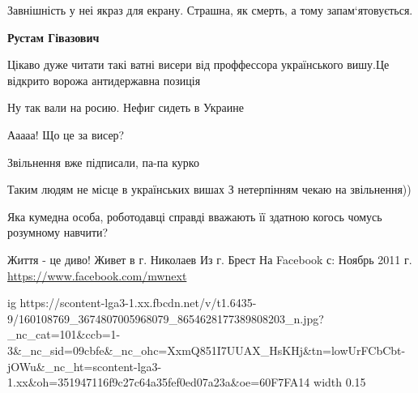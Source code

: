 Завнішність у неі якраз для екрану. Страшна, як смерть, а тому
запам‘ятовується.



\textbf{Рустам Гівазович}


Цікаво дуже читати такі ватні висери від проффессора українського вишу.Це відкрито ворожа антидержавна позиція


Ну так вали на росию. Нефиг сидеть в Украине


Ааааа! Що це за висер?


Звільнення вже підписали, па-па курко


Таким людям не місце в українських вишах
З нетерпінням чекаю на звільнення))


Яка кумедна особа, роботодавці справді вважають її здатною когось чомусь розумному навчити?

Життя - це диво!
Живет в г. Николаев
Из г. Брест
На Facebook с: Ноябрь 2011 г.
\url{https://www.facebook.com/mwnext}\par
\ifcmt
  ig https://scontent-lga3-1.xx.fbcdn.net/v/t1.6435-9/160108769_3674807005968079_8654628177389808203_n.jpg?_nc_cat=101&ccb=1-3&_nc_sid=09cbfe&_nc_ohc=XxmQ851I7UUAX_HsKHj&tn=lowUrFCbCbt-jOWu&_nc_ht=scontent-lga3-1.xx&oh=351947116f9c27c64a35fef0ed07a23a&oe=60F7FA14
  width 0.15


